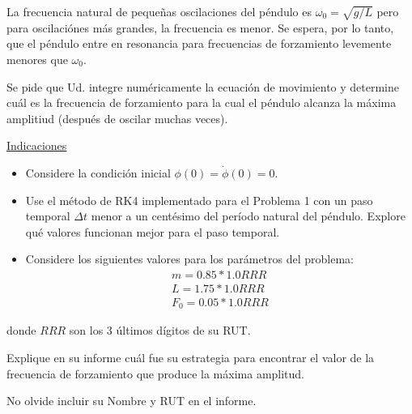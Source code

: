 \documentclass[letter, 11pt]{article}
\begin{document}
La frecuencia natural de pequeñas oscilaciones del péndulo es
$\omega_0=\sqrt{g/L}$ pero para oscilaciónes más grandes, la frecuencia es
menor. Se espera, por lo tanto, que el péndulo entre en resonancia para
frecuencias de forzamiento levemente menores que $\omega_0$.

Se pide que Ud. integre numéricamente la ecuación de movimiento y determine
cuál es la frecuencia de forzamiento para la cual el péndulo alcanza la máxima
amplitiud (después de oscilar muchas veces).

\vspace{0.5em}
\noindent\underline{Indicaciones}

\begin{itemize}
  \item Considere la condición inicial $\phi(0) = \dot{\phi}(0) = 0$.
  \item Use el método de RK4 implementado para el Problema 1 con un paso
    temporal $\Delta t$ menor a un centésimo del período natural del péndulo.
    Explore qué valores funcionan mejor para el paso temporal.
  \item Considere los siguientes valores para los parámetros del problema:
    \begin{align*}
      m = 0.85 * 1.0RRR \\
      L = 1.75 * 1.0RRR \\
      F_0 = 0.05 * 1.0RRR
    \end{align*}
\end{itemize}

donde $RRR$ son los 3 últimos dígitos de su RUT.

Explique en su informe cuál fue su estrategia para encontrar el valor de la
frecuencia de forzamiento que produce la máxima amplitud.

\begin{ayuda}
  \small
  No olvide incluir su Nombre y RUT en el informe.
\end{ayuda}





\end{document}
